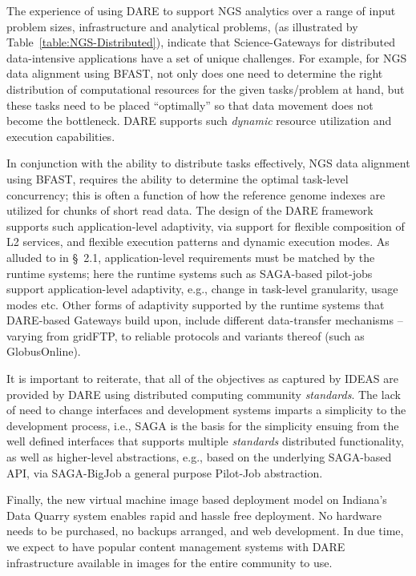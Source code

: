 \documentclass[]{svjour3}
\begin{document}
The experience of using DARE to support NGS analytics over a range of
input problem sizes, infrastructure and analytical problems, (as
illustrated by Table~\ref{table:NGS-Distributed}), indicate that
Science-Gateways for distributed data-intensive applications have a
set of unique challenges. For example, for NGS data alignment using
BFAST, not only does one need to determine the right distribution of
computational resources for the given tasks/problem at hand, but these
tasks need to be placed ``optimally'' so that data movement does not
become the bottleneck. DARE supports such {\it dynamic} resource
utilization and execution capabilities.


In conjunction with the ability to distribute tasks effectively, NGS
data alignment using BFAST, requires the ability to determine the
optimal task-level concurrency; this is often a function of how the
reference genome indexes are utilized for chunks of short read
data\cite{dare-ecmls11}. The design of the DARE framework supports
such application-level adaptivity, via support for flexible
composition of L2 services, and flexible execution patterns and
dynamic execution modes. As alluded to in \S~2.1, application-level
requirements must be matched by the runtime systems; here the runtime
systems such as SAGA-based pilot-jobs support application-level
adaptivity, e.g., change in task-level granularity, usage modes etc.
Other forms of adaptivity supported by the runtime systems that
DARE-based Gateways build upon, include different data-transfer
mechanisms -- varying from gridFTP, to reliable protocols and variants
thereof (such as GlobusOnline).

It is important to reiterate, that all of the objectives as captured
by IDEAS are provided by DARE using distributed computing community
{\it standards}. The lack of need to change interfaces and development
systems imparts a simplicity to the development process, i.e., SAGA is
the basis for the simplicity ensuing from the well defined interfaces
that supports multiple {\it standards} distributed functionality, as
well as higher-level abstractions, e.g., based on the underlying
SAGA-based API, via SAGA-BigJob a general purpose Pilot-Job
abstraction.

Finally, the new virtual machine image based deployment model on
Indiana's Data Quarry system enables rapid and hassle free
deployment. No hardware needs to be purchased, no backups arranged,
and web development. In due time, we expect to have popular content
management systems with DARE infrastructure available in images for
the entire community to use.
\end{document}
